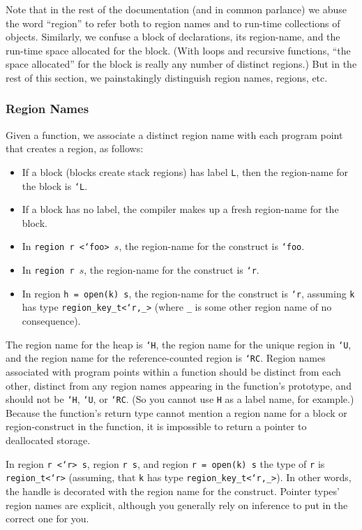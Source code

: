 Note that in the rest of the documentation (and in common parlance) we
abuse the word ``region'' to refer both to region names and to
run-time collections of objects.  Similarly, we confuse a block of
declarations, its region-name, and the run-time space allocated for
the block.  (With loops and recursive functions, ``the space
allocated'' for the block is really any number of distinct regions.)
But in the rest of this section, we painstakingly distinguish
region names, regions, etc.

\subsubsection{Region Names}

Given a function, we associate a distinct region name with each
program point that creates a region, as follows:

\begin{itemize}
\item If a block (blocks create stack regions) has label \texttt{L},
  then the region-name for the block is \texttt{`L}.
\item If a block has no label, the compiler makes up a fresh
  region-name for the block.
\item In \texttt{region r <`foo> $s$}, the region-name for the construct
  is \texttt{`foo}.
\item In \texttt{region r $s$}, the region-name for the construct is
  \texttt{`r}.
\item In region \texttt{h = open(k) s}, the region-name for the construct is
  \texttt{`r}, assuming \texttt{k} has type \texttt{region\_key\_t<`r,\_>}
  (where \texttt{\_} is some other region name of no consequence).
\end{itemize}

The region name for the heap is \texttt{`H}, the region name for the unique
region in \texttt{`U}, and the region name for the reference-counted region
is \texttt{`RC}.  Region names associated with program points within a
function should be distinct from each other, distinct from any region names
appearing in the function's prototype, and should not be \texttt{`H},
\texttt{`U}, or \texttt{`RC}.  (So you cannot use \texttt{H} as a label
name, for example.)  Because the function's return type cannot mention a
region name for a block or region-construct in the function, it is
impossible to return a pointer to deallocated storage.

In region \texttt{r <`r> s}, region \texttt{r s}, and region \texttt{r =
open(k) s} the type of \texttt{r} is \texttt{region\_t<`r>} (assuming, that
\texttt{k} has type \texttt{region\_key\_t<`r,\_>}). In other words, the
handle is decorated with the region name for the construct.  Pointer types'
region names are explicit, although you generally rely on inference to put
in the correct one for you.

